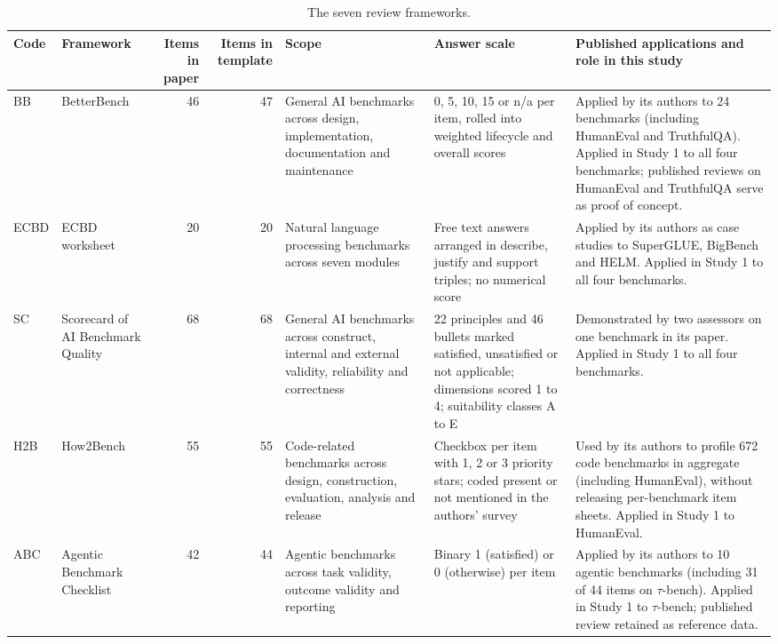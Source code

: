\documentclass[10pt,conference]{IEEEtran}
\begin{document}
\begin{table}[t]
\caption{The seven review frameworks.}
\label{tab:frameworks}
\centering
\small
\begin{tabularx}{\textwidth}{@{}llrrXXX@{}}
\toprule
\textbf{Code} & \textbf{Framework} & \textbf{Items in paper} & \textbf{Items in template} & \textbf{Scope} & \textbf{Answer scale} & \textbf{Published applications and role in this study} \\
\midrule
BB & BetterBench \cite{reuel_betterbench} & 46 & 47 & General AI benchmarks across design, implementation, documentation and maintenance & 0, 5, 10, 15 or n/a per item, rolled into weighted lifecycle and overall scores & Applied by its authors to 24 benchmarks (including HumanEval and TruthfulQA). Applied in Study 1 to all four benchmarks; published reviews on HumanEval and TruthfulQA serve as proof of concept. \\
ECBD & ECBD worksheet \cite{liu_ecbd_2024} & 20 & 20 & Natural language processing benchmarks across seven modules & Free text answers arranged in describe, justify and support triples; no numerical score & Applied by its authors as case studies to SuperGLUE, BigBench and HELM. Applied in Study 1 to all four benchmarks. \\
SC & Scorecard of AI Benchmark Quality \cite{san_joaquin_scorecard_2026} & 68 & 68 & General AI benchmarks across construct, internal and external validity, reliability and correctness & 22 principles and 46 bullets marked satisfied, unsatisfied or not applicable; dimensions scored 1 to 4; suitability classes A to E & Demonstrated by two assessors on one benchmark in its paper. Applied in Study 1 to all four benchmarks. \\
H2B & How2Bench \cite{cao_how2bench_2025} & 55 & 55 & Code-related benchmarks across design, construction, evaluation, analysis and release & Checkbox per item with 1, 2 or 3 priority stars; coded present or not mentioned in the authors' survey & Used by its authors to profile 672 code benchmarks in aggregate (including HumanEval), without releasing per-benchmark item sheets. Applied in Study 1 to HumanEval. \\
ABC & Agentic Benchmark Checklist \cite{zhu_agentic_benchmark_checklist_2025} & 42 & 44 & Agentic benchmarks across task validity, outcome validity and reporting & Binary 1 (satisfied) or 0 (otherwise) per item & Applied by its authors to 10 agentic benchmarks (including 31 of 44 items on $\tau$-bench). Applied in Study 1 to $\tau$-bench; published review retained as reference data. \\

\end{tabularx}
\end{table}
\end{document}
